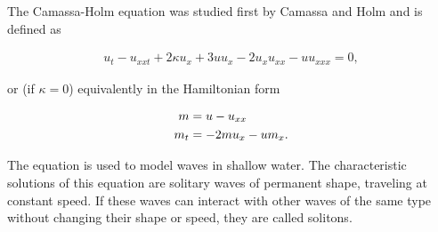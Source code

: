 The Camassa-Holm equation was studied first by Camassa and Holm \cite{camassa1993integrable} and is defined as

\begin{align*}
u_{t} - u_{xxt} + 2\kappa u_{x} + 3uu_{x} - 2u_{x}u_{xx} - uu_{xxx} = 0,
\end{align*}

or (if $\kappa = 0$) equivalently in the Hamiltonian form

\begin{align}
m &= u - u_{xx} \notag \\
m_t &= -2mu_x - um_x.
\label{eq:CHhamiltonian}
\end{align}

The equation is used to model waves in shallow water. The characteristic solutions of this equation are solitary waves of permanent shape, traveling at constant speed. If these waves can interact with other waves of the same type without changing their shape or speed, they are called solitons. 

